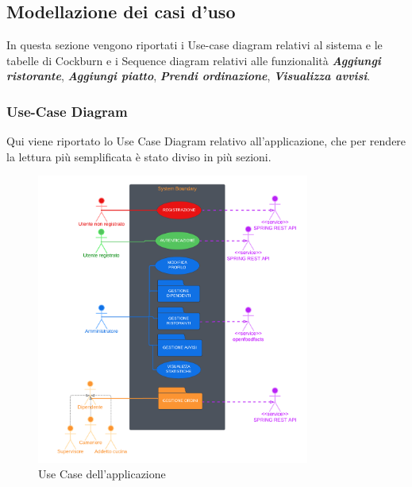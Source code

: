 \subsection{Modellazione dei casi d'uso}

    \begin{flushleft}
        In questa sezione vengono riportati i Use-case diagram relativi al sistema e le tabelle di Cockburn e i Sequence diagram relativi alle funzionalità  \emph{\textbf{Aggiungi ristorante}},  \emph{\textbf{Aggiungi piatto}},  \emph{\textbf{Prendi ordinazione}},  \emph{\textbf{Visualizza avvisi}}.
    \end{flushleft}

    \subsubsection{Use-Case Diagram}
        \begin{flushleft}
            Qui viene riportato lo Use Case Diagram relativo all'applicazione, che per rendere la lettura più semplificata 
            è stato diviso in più sezioni.
        \end{flushleft}
        
        \begin{figure}[H]
            \centering
            \includegraphics[width=0.8\textwidth]{assets/diagrammi/Use-Case/Use-Case Generale.png}
            \caption{Use Case dell'applicazione}
            \label{fig:ucdGenerale}
        \end{figure}
        
